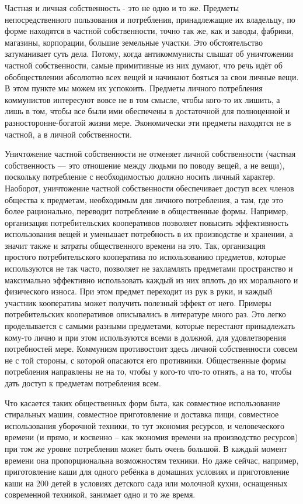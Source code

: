 \documentclass[12pt,a4paper,openany]{book}
\begin{document}
Частная и личная собственность - это не одно и то же. Предметы непосредственного пользования и потребления, принадлежащие их владельцу, по форме находятся в частной собственности, точно так же, как и заводы, фабрики, магазины, корпорации, большие земельные участки. Это обстоятельство затуманивает суть дела. Потому, когда антикоммунисты слышат об уничтожении частной собственности, самые примитивные из них думают, что речь идёт об обобществлении абсолютно всех вещей и начинают бояться за свои личные вещи. В этом пункте мы можем их успокоить. Предметы личного потребления коммунистов интересуют вовсе не в том смысле, чтобы кого-то их лишить, а лишь в том, чтобы все были ими обеспечены в достаточной для полноценной и разносторонне-богатой жизни мере. Экономически эти предметы находятся не в частной, а в личной собственности.

Уничтожение частной собственности не отменяет личной собственности (частная собственность — это отношение между людьми по поводу вещей, а не вещи), поскольку потребление с необходимостью должно носить личный характер. Наоборот, уничтожение частной собственности обеспечивает доступ всех членов общества к предметам, необходимым для личного потребления, а там, где это более рационально, переводит потребление в общественные формы. Например, организация потребительских кооперативов позволяет повысить эффективность использования вещей и уменьшает потребность в их производстве и хранении, а значит также и затраты общественного времени на это. Так, организация простого потребительского кооператива по использованию предметов, которые используются не так часто, позволяет не захламлять предметами пространство и максимально эффективно использовать каждый из них вплоть до их морального и физического износа. При этом предмет переходит из рук в руки, и каждый участник кооператива может получить полезный эффект от него. Примеры потребительских кооперативов описывались в литературе много раз. Это легко проделывается с самыми разными предметами, которые перестают принадлежать кому-то лично и при этом используются всеми в должной, для удовлетворения потребностей мере. Коммунизм противостоит здесь личной собственности совсем не с той стороны, с которой опасаются его противники. Общественные формы потребления направлены не на то, чтобы у кого-то что-то отнять, а на то, чтобы дать доступ к предметам потребления всем.

Что касается таких общественных форм быта, как совместное использование стиральных машин, совместное приготовление и доставка пищи, совместное использования уборочной техники, то тут экономия ресурсов, и человеческого времени (и прямо, и косвенно – как экономия времени на производство ресурсов) при том же уровне потребления может быть очень большой. В каждый момент времени она пропорциональна возможностям техники. Но даже сейчас, например, приготовление каши для одного ребёнка в домашних условиях и приготовление каши на 200 детей в условиях детского сада или молочной кухни, оснащенных современной техникой, занимает одно и то же время.
\end{document}
